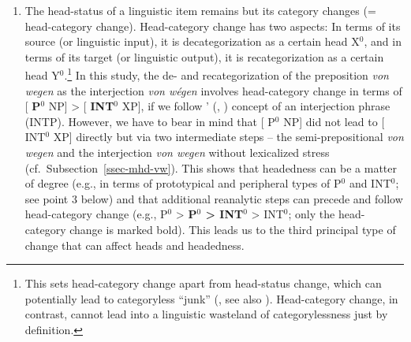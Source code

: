 \documentclass[output=paper
  ,nobabel
  ,draftmode
  ,babelshorthands
  ,colorlinks, citecolor=brown
]{langscibook}
\begin{document}
\begin{enumerate}
\largerpage    
\item	The head-status of a linguistic item remains but its category changes (= head-category change). Head-category change has two aspects: In terms of its source (or linguistic input), it is decategorization as a certain head X$^0$, and in terms of its target (or linguistic output), it is recategorization as a certain head Y$^0$.\footnote{This sets head-category change apart from head-status change, which can potentially lead to categoryless ``junk'' (\citealp{Lass1990}, see also \citealp{Simon2010}). Head-category change, in contrast, cannot lead into a linguistic wasteland of categorylessness just by definition.}
    In this study, the de- and recategorization of the preposition \emph{von wegen} as the interjection \emph{von wégen} involves head-category change in terms of [ \textbf{P$^0$} NP] > [ \textbf{INT$^0$} XP], if we follow \citeauthor{Fries1992}' (\citeyear{Fries1992}, \citeyear{Fries22}) concept of an interjection phrase (INTP). However, we have to bear in mind that [ P$^0$ NP] did not lead to [ INT$^0$ XP] directly but via two intermediate steps – the semi-prepositional \emph{von wegen} and the interjection \emph{von wegen} without lexicalized stress (cf.\ Subsection~\ref{ssec-mhd-vw}). This shows that headedness can be a matter of degree (e.g., in terms of prototypical and peripheral types of P$^0$ and INT$^0$; see point 3 below) and that additional reanalytic steps can precede and follow head-category change (e.g., P$^0$ > \textbf{P$^0$ > INT$^0$} > INT$^0$; only the head-category change is marked bold). This leads us to the third principal type of change that can affect heads and headedness.
    

\end{enumerate}
\end{document}
